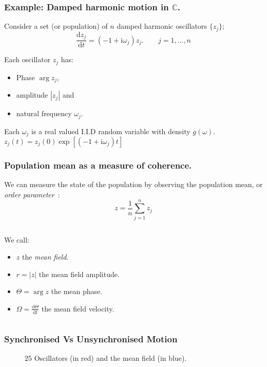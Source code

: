 \documentclass[10pt,reqno]{beamer}
\newcommand{\D}[2]{\frac{\mathrm{d} #1}{\mathrm{d} #2}}
\newcommand{\I}{\mathrm{i}}
\newcommand{\complex}{\mathbb{C}}
\begin{document}
\begin{frame}[t]
\frametitle{Example: Damped harmonic motion in $\complex$.} 
Consider a set (or population) of $n$ damped harmonic oscillators $\{z_j\}$;
\[
\D{z_j}{t} =(-1+\I\omega_j)z_j. \qquad j=1,\ldots,n
\] 
\begin{minipage}{0.49\textwidth}

\vspace{0.5cm}
Each oscillator $z_j$ has:
\begin{itemize}
	\item Phase $\arg{z_j}$,
	\item amplitude $|z_j|$ and 
	\item natural frequency $\omega_j$.
\end{itemize}

Each $\omega_j$ is a real valued I.I.D random variable with density $g(\omega)$.\\

$z_j(t) = z_j(0)\exp[(-1+\I\omega_j)t]$
\end{minipage}
\begin{minipage}{0.49\textwidth}
	\begin{figure}
	\end{figure}
	\centering

\end{minipage}
\end{frame}
\begin{frame}
\frametitle{Population mean as a measure of coherence.}
We can measure the state of the population by observing the population mean, or {\em order parameter}~\cite{kuramoto75}:
\[
z = \frac{1}{n}\sum_{j=1}^n z_j
\]
\begin{columns}
\begin{column}{0.59\textwidth}
	We call:
	\begin{itemize}
		\item $z$ the {\em mean field}.
		\item $r=|z|$ the mean field amplitude.
		\item $\Theta = \arg{z}$ the mean phase.
		\item $\Omega = \D{\Theta}{t}$ the mean field velocity.
	\end{itemize}
\end{column}
\begin{column}{0.39\textwidth}
	\begin{figure}
	\end{figure}
\end{column}
\end{columns}
\end{frame}
\begin{frame}
\frametitle{Synchronised Vs Unsynchronised Motion}
\begin{figure}
	\caption{$25$ Oscillators (in red) and the mean field (in blue).}
\end{figure}
\end{frame}
\end{document}
